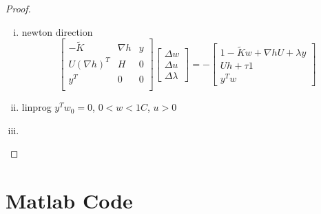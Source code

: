 \documentclass{article}
\theoremstyle{remark}
\theoremstyle{definition}
\begin{document}
\begin{proof}
\begin{enumerate}[(a)]
\begin{enumerate}[(i)]
        \item newton direction
        \[ \begin{bmatrix}
        -\widetilde{K} & \nabla h & y\\
        U(\nabla h)^T& H & 0 \\
        y^T & 0 & 0 \\
        \end{bmatrix} \begin{bmatrix}
        \Delta w\\
        \Delta u\\
        \Delta \lambda
        \end{bmatrix}=-\begin{bmatrix}
        1-\widetilde{K}w+\nabla hU +\lambda y\\
        Uh + \tau 1\\
        y^Tw
        \end{bmatrix}
        \]
        
        \item  linprog $y^Tw_0 = 0$, $0<w<1C$, $u>0$
        
        \item 
        
           
            \end{enumerate}
            
        \end{enumerate}
\end{proof}

\section*{Matlab Code}



















\end{document}
